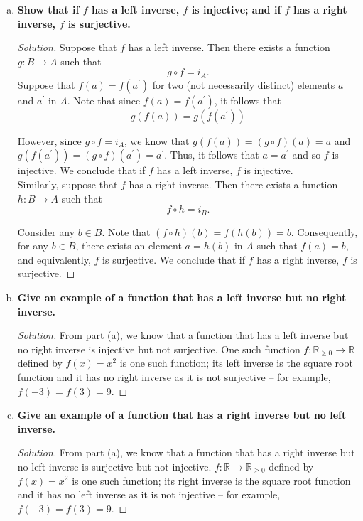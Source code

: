 \documentclass[11pt]{article}
\newcommand{\R}{\mathbb{R}}
\newenvironment{solution}
  {\renewcommand\qedsymbol{$\blacksquare$}\begin{proof}[Solution]}
  {\end{proof}}
\begin{document}
\begin{enumerate}[a)]
    \item \textbf{Show that if $f$ has a left inverse, $f$ is injective; and if $f$ has a right inverse, $f$ is surjective.}
    \begin{solution}
    Suppose that $f$ has a left inverse. Then there exists a function $g \colon B \rightarrow A$ such that 
    \[
      g \circ f = i_A.
    \]
    Suppose that $f(a) = f(a^{\prime})$ for two (not necessarily distinct) elements $a$ and $a^{\prime}$ in $A$. Note that since $f(a) = f(a^{\prime})$, it follows that
    \[
      g(f(a)) = g(f(a^{\prime}))
    \]

    However, since $g \circ f = i_A$, we know that $g(f(a)) = (g \circ f)(a) = a$ and $g(f(a^{\prime})) = (g \circ f)(a^{\prime}) = a^{\prime}$. Thus, it follows that $a = a^{\prime}$
    and so $f$ is injective. We conclude that if $f$ has a left inverse, $f$ is injective. \\

    Similarly, suppose that $f$ has a right inverse. Then there exists a function $h \colon B \rightarrow A$ such that 
    \[
      f \circ h = i_B.
    \]
    
    Consider any $b \in B$. Note that $(f \circ h)(b) = f(h(b)) = b$. Consequently, for any $b \in B$, there exists an element $a = h(b)$ in $A$ such that
    $f(a) = b$, and equivalently, $f$ is surjective. We conclude that if $f$ has a right inverse, $f$ is surjective.
    \end{solution}

    \item \textbf{Give an example of a function that has a left inverse but no right inverse.}
    
    \begin{solution}
    From part (a), we know that a function that has a left inverse but no right inverse is injective but not surjective. 
    One such function $f \colon \R_{\geq 0} \rightarrow \R$ defined by $f(x) = x^2$ is one such function; its left inverse is the square root function
    and it has no right inverse as it is not surjective -- for example, $f(-3) = f(3) = 9$.       
    \end{solution}
    \item \textbf{Give an example of a function that has a right inverse but no left inverse.}
    
    \begin{solution}
    From part (a), we know that a function that has a right inverse but no left inverse is surjective but not injective. 
    $f \colon \R \rightarrow \R_{\geq 0}$ defined by $f(x) = x^2$ is one such function; its right inverse is the square root function and it has 
    no left inverse as it is not injective -- for example, $f(-3) = f(3) = 9$. 
    \end{solution}
    

\end{enumerate}
\end{document}
